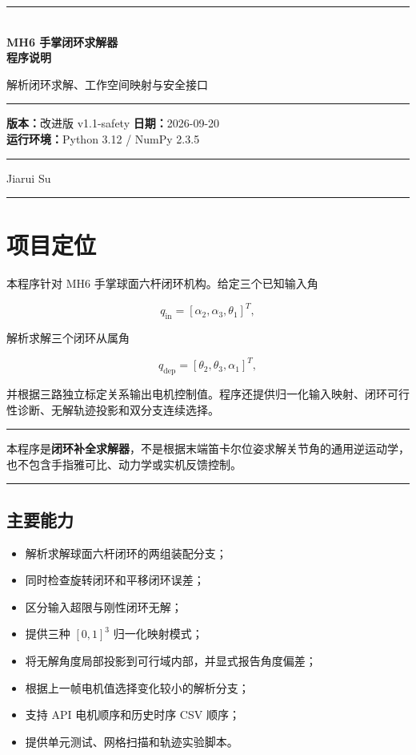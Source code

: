 \documentclass[11pt,a4paper,fontset=none]{ctexart}
\newenvironment{summarybox}{%
  \par\smallskip\noindent\begin{minipage}{\linewidth}%
  \color{SustechGreen}\rule{\linewidth}{0.8pt}\par\smallskip\color{Ink}%
}{%
  \par\smallskip\color{SustechGreen}\rule{\linewidth}{0.8pt}%
  \end{minipage}\par\smallskip%
}
\begin{document}
\begin{titlepage}
  \centering
  \vspace*{28mm}
  {\color{SustechOrange}\rule{\textwidth}{3pt}}\\[15mm]
  {\Huge\bfseries\color{Ink} MH6 手掌闭环求解器\\[4mm]程序说明}\par
  \vspace{8mm}
  {\Large\color{SustechGreen}解析闭环求解、工作空间映射与安全接口}\par
  \vfill
  \begin{summarybox}
    \centering
    \textbf{版本：}改进版 v1.1-safety\quad
    \textbf{日期：}2026-09-20\\[2mm]
    \textbf{运行环境：}Python 3.12 / NumPy 2.3.5
  \end{summarybox}
  \vfill
  {\large Jiarui Su}\par
  \vspace{8mm}
  {\color{SustechOrange}\rule{\textwidth}{3pt}}
\end{titlepage}

\tableofcontents
\newpage

\section{项目定位}

本程序针对 MH6 手掌球面六杆闭环机构。给定三个已知输入角

\[
q_{\mathrm{in}}=[\alpha_2,\alpha_3,\theta_1]^T,
\]

解析求解三个闭环从属角

\[
q_{\mathrm{dep}}=[\theta_2,\theta_3,\alpha_1]^T,
\]

并根据三路独立标定关系输出电机控制值。程序还提供归一化输入映射、闭环可行性诊断、无解轨迹投影和双分支连续选择。

\begin{summarybox}
本程序是\textbf{闭环补全求解器}，不是根据末端笛卡尔位姿求解关节角的通用逆运动学，也不包含手指雅可比、动力学或实机反馈控制。
\end{summarybox}

\subsection{主要能力}

\begin{itemize}
  \item 解析求解球面六杆闭环的两组装配分支；
  \item 同时检查旋转闭环和平移闭环误差；
  \item 区分输入超限与刚性闭环无解；
  \item 提供三种 $[0,1]^3$ 归一化映射模式；
  \item 将无解角度局部投影到可行域内部，并显式报告角度偏差；
  \item 根据上一帧电机值选择变化较小的解析分支；
  \item 支持 API 电机顺序和历史时序 CSV 顺序；
  \item 提供单元测试、网格扫描和轨迹实验脚本。
\end{itemize}
\end{document}
